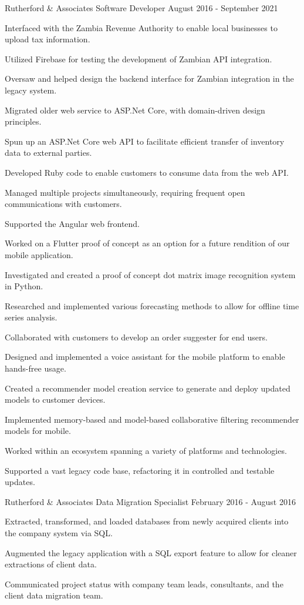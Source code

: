 \documentclass{marvinkassabian_resume}
\begin{document}
\subsectionpositiondate
{Rutherford \& Associates}
{Software Developer}
{August 2016 - September 2021}
\resumesublistbegin
\item Interfaced with the Zambia Revenue Authority to enable local businesses to upload tax information.
\item Utilized Firebase for testing the development of Zambian API integration.
\item Oversaw and helped design the backend interface for Zambian integration in the legacy system.
\item Migrated older web service to ASP.Net Core, with domain-driven design principles.
\item Spun up an ASP.Net Core web API to facilitate efficient transfer of inventory data to external parties.
\item Developed Ruby code to enable customers to consume data from the web API.
\item Managed multiple projects simultaneously, requiring frequent open communications with customers.
\item Supported the Angular web frontend.
\item Worked on a Flutter proof of concept as an option for a future rendition of our mobile application.
\item Investigated and created a proof of concept dot matrix image recognition system in Python.
\item Researched and implemented various forecasting methods to allow for offline time series analysis.
\item Collaborated with customers to develop an order suggester for end users.
\item Designed and implemented a voice assistant for the mobile platform to enable hands-free usage.
\item Created a recommender model creation service to generate and deploy updated models to customer devices.
\item Implemented memory-based and model-based collaborative filtering recommender models for mobile.
\item Worked within an ecosystem spanning a variety of platforms and technologies.
\item Supported a vast legacy code base, refactoring it in controlled and testable updates.
\resumesublistend

\subsectionpositiondate
{Rutherford \& Associates}
{Data Migration Specialist}
{February 2016 - August 2016}
\resumesublistbegin
\item Extracted, transformed, and loaded databases from newly acquired clients into the company system via SQL.
\item Augmented the legacy \cpp application with a SQL export feature to allow for cleaner extractions of client data.
\item Communicated project status with company team leads, consultants, and the client data migration team.
\resumesublistend
\end{document}
